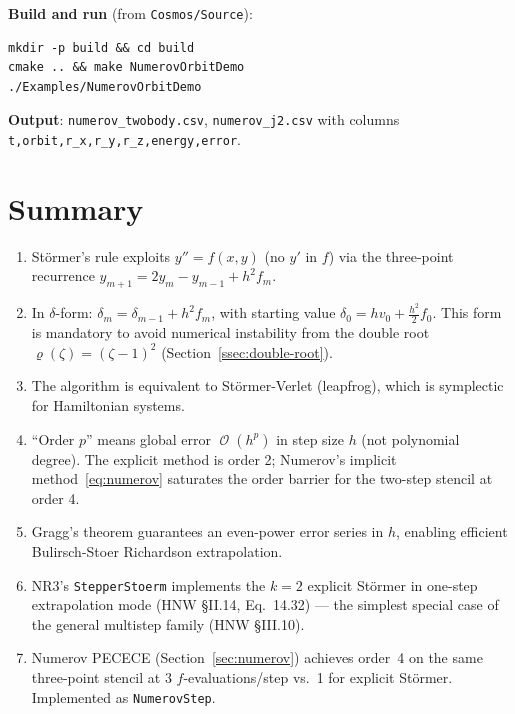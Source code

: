 \documentclass[11pt]{article}
\DeclareMathOperator{\OO}{\mathcal{O}}
\begin{document}
\noindent
\textbf{Build and run} (from \texttt{Cosmos/Source}):
\begin{verbatim}
mkdir -p build && cd build
cmake .. && make NumerovOrbitDemo
./Examples/NumerovOrbitDemo
\end{verbatim}

\noindent
\textbf{Output}: \texttt{numerov\_twobody.csv}, \texttt{numerov\_j2.csv} with columns \texttt{t,orbit,r\_x,r\_y,r\_z,energy,error}.

\section{Summary}

\begin{enumerate}
  \item Störmer's rule exploits $y'' = f(x, y)$ (no $y'$ in $f$) via the
        three-point recurrence $y_{m+1} = 2y_m - y_{m-1} + h^2 f_m$.

  \item In $\delta$-form: $\delta_m = \delta_{m-1} + h^2 f_m$, with starting value
        $\delta_0 = hv_0 + \tfrac{h^2}{2}f_0$.  This form is mandatory to
        avoid numerical instability from the double root $\varrho(\zeta) =
        (\zeta-1)^2$ (Section~\ref{ssec:double-root}).

  \item The algorithm is equivalent to Störmer-Verlet (leapfrog), which is
        symplectic for Hamiltonian systems.

  \item ``Order $p$'' means global error $\OO(h^p)$ in step size $h$ (not
        polynomial degree).  The explicit method is order 2;
        Numerov's implicit method~\eqref{eq:numerov} saturates the order barrier
        for the two-step stencil at order 4.

  \item Gragg's theorem guarantees an even-power error series in $h$, enabling
        efficient Bulirsch-Stoer Richardson extrapolation.

  \item NR3's \texttt{StepperStoerm} implements the $k=2$ explicit Störmer in
        one-step extrapolation mode (HNW §II.14, Eq.~14.32) --- the simplest
        special case of the general multistep family (HNW §III.10).

  \item Numerov PECECE (Section~\ref{sec:numerov}) achieves order~4 on the same
        three-point stencil at 3 $f$-evaluations/step vs.\ 1 for explicit
        Störmer.  Implemented as \texttt{NumerovStep}.
\end{enumerate}
\end{document}
